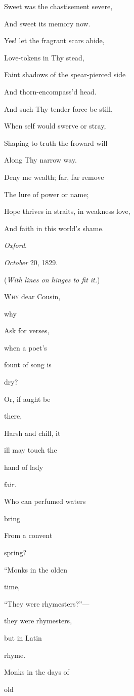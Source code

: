 Sweet was the chastisement severe,

And sweet its
memory now.

Yes! let the fragrant scars abide,

Love-tokens in Thy
stead,

Faint shadows of the spear-pierced side

And thorn-encompass'd
head.

And such Thy tender force be still,

When self would
swerve or stray,

Shaping to truth the froward will

Along Thy narrow
way. 

Deny me wealth; far, far remove

The lure of power
or name;

Hope thrives in straits, in weakness love,

And faith in this
world's shame.

\emph{Oxford}.

\emph{October} 20, 1829.


(\emph{With lines on hinges to fit
it.})

W\textsc{hy} dear Cousin,

why

Ask for verses,

when a poet's

fount of song is

dry?

Or, if aught be

there,

Harsh and chill, it

ill may touch the

hand of lady

fair.

Who can perfumed waters

bring

From a convent

spring? 

``Monks in the olden

time,

``They were rhymesters?''—

they were rhymesters,

but in Latin

rhyme.

Monks in the days of

old

